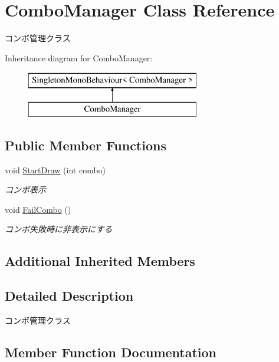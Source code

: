 \hypertarget{class_combo_manager}{}\section{Combo\+Manager Class Reference}
\label{class_combo_manager}


コンボ管理クラス  


Inheritance diagram for Combo\+Manager\+:\begin{figure}[H]
\begin{center}
\leavevmode
\includegraphics[height=2.000000cm]{class_combo_manager}
\end{center}
\end{figure}
\subsection*{Public Member Functions}
\begin{DoxyCompactItemize}
\item 
void \hyperlink{class_combo_manager_afcf63ba113ec108b6879cadfa6bc3be7}{Start\+Draw} (int combo)
\begin{DoxyCompactList}\small\item\em コンボ表示 \end{DoxyCompactList}\item 
void \hyperlink{class_combo_manager_a4c07555285dad869b35231f257f69db5}{Fail\+Combo} ()
\begin{DoxyCompactList}\small\item\em コンボ失敗時に非表示にする \end{DoxyCompactList}\end{DoxyCompactItemize}
\subsection*{Additional Inherited Members}


\subsection{Detailed Description}
コンボ管理クラス 



\subsection{Member Function Documentation}
